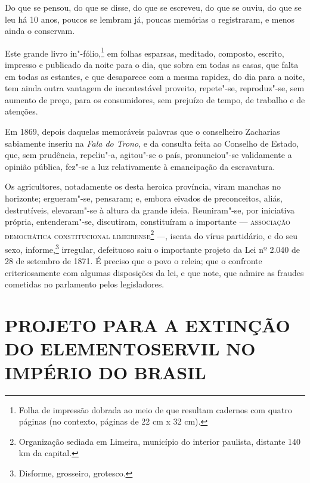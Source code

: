 Do que se pensou, do que se disse, do que se escreveu, do que se ouviu,
do que se leu há 10 anos, poucos se lembram já, poucas memórias o
registraram, e menos ainda o conservam.

Este grande livro in"-fólio,\footnote{
  Folha de impressão dobrada ao meio de que resultam cadernos com quatro páginas (no
  contexto, páginas de 22 cm x 32 cm).} em folhas esparsas, meditado,
composto, escrito, impresso e publicado da noite para o dia, que sobra
em todas as casas, que falta em todas as estantes, e que desaparece com
a mesma rapidez, do dia para a noite, tem ainda outra vantagem de
incontestável proveito, repete"-se, reproduz"-se, sem aumento de preço,
para os consumidores, sem prejuízo de tempo, de trabalho e de atenções.

Em 1869, depois daquelas memoráveis palavras que o conselheiro Zacharias
sabiamente inseriu na \emph{Fala do Trono}, e da consulta feita ao
Conselho de Estado, que, sem prudência, repeliu"-a, agitou"-se o país,
pronunciou"-se validamente a opinião pública, fez"-se a luz relativamente
à emancipação da escravatura.

Os agricultores, notadamente os desta heroica província, viram manchas
no horizonte; ergueram"-se, pensaram; e, embora eivados de preconceitos,
aliás, destrutíveis, elevaram"-se à altura da grande ideia. Reuniram"-se,
por iniciativa própria, entenderam"-se, discutiram, constituíram a
importante --- \textsc{associação democrática constitucional
limeirense}\footnote{Organização sediada em Limeira, município do
  interior paulista, distante 140 km da capital.} ---, isenta do vírus
partidário, e do seu sexo, informe,\footnote{Disforme, grosseiro,
  grotesco.} irregular, defeituoso saiu o importante projeto da Lei nº
2.040 de 28 de setembro de 1871. É preciso que o povo o releia; que o
confronte criteriosamente com algumas disposições da lei, e que note,
que admire as fraudes cometidas no parlamento pelos legisladores.

\section*{PROJETO PARA A EXTINÇÃO DO ELEMENTO\break SERVIL NO IMPÉRIO DO BRASIL}

